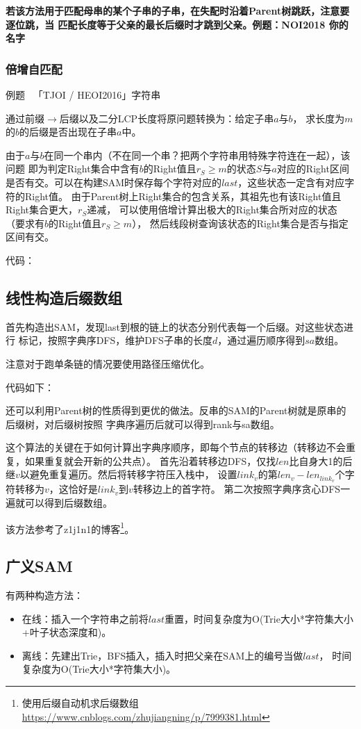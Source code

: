 {\bfseries 若该方法用于匹配母串的某个子串的子串，在失配时沿着Parent树跳跃，注意要逐位跳，当
匹配长度等于父亲的最长后缀时才跳到父亲。例题：NOI2018 你的名字}
\subsubsection{倍增自匹配}
例题~ 「TJOI / HEOI2016」字符串

通过前缀$\rightarrow$后缀以及二分LCP长度将原问题转换为：给定子串$a$与$b$，
求长度为$m$的$b$的后缀是否出现在子串$a$中。

由于$a$与$b$在同一个串内（不在同一个串？把两个字符串用特殊字符连在一起），该问题
即为判定Right集合中含有$b$的Right值且$r_S\geq m$的状态$S$与$a$对应的Right区间
是否有交。可以在构建SAM时保存每个字符对应的$last$，这些状态一定含有对应字符的Right值。
由于Parent树上Right集合的包含关系，其祖先也有该Right值且Right集合更大，$r_S$递减，
可以使用倍增计算出极大的Right集合所对应的状态（要求有$b$的Right值且$r_S\geq m$），
然后线段树查询该状态的Right集合是否与指定区间有交。

代码：

\subsection{线性构造后缀数组}
首先构造出SAM，发现last到根的链上的状态分别代表每一个后缀。对这些状态进行
标记，按照字典序DFS，维护DFS子串的长度$d$，通过遍历顺序得到$sa$数组。

注意对于跑单条链的情况要使用路径压缩优化。

代码如下：


还可以利用Parent树的性质得到更优的做法。反串的SAM的Parent树就是原串的后缀树，对后缀树按照
字典序遍历后就可以得到rank与sa数组。

这个算法的关键在于如何计算出字典序顺序，即每个节点的转移边（转移边不会重复，如果重复就会开新的公共点）。
首先沿着转移边DFS，仅找$len$比自身大1的后继$v$以避免重复遍历。然后将转移字符压入栈中，
设置$link_v$的第$len_v-len_{link_v}$个字符转移为$v$，这恰好是$link_v$到$v$转移边上的首字符。
第二次按照字典序贪心DFS一遍就可以得到后缀数组。

该方法参考了z1j1n1的博客\footnote{
    使用后缀自动机求后缀数组\\
    \url{https://www.cnblogs.com/zhujiangning/p/7999381.html}
}。
\subsection{广义SAM}
有两种构造方法：
\begin{itemize}
    \item 在线：插入一个字符串之前将$last$重置，时间复杂度为O(Trie大小*字符集大小
    +叶子状态深度和)。
    \item 离线：先建出Trie，BFS插入，插入时把父亲在SAM上的编号当做$last$，
    时间复杂度为O(Trie大小*字符集大小)。
\end{itemize}

